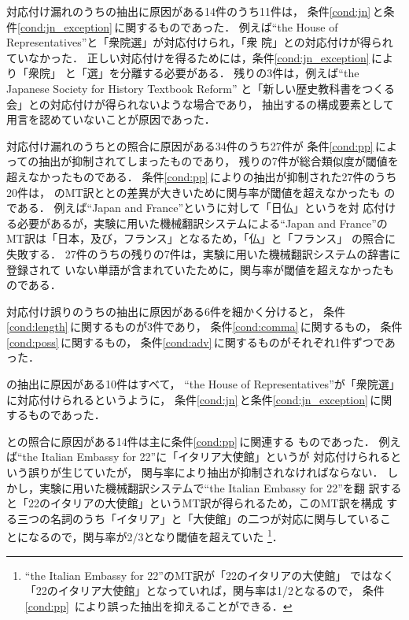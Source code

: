 対応付け漏れのうち{\JNP}の抽出に原因がある14件のうち11件は，
条件\ref{cond:jn}\,と条件\ref{cond:jn_exception}\,に関するものであった．
例えば``the House of Representatives''と「衆院選」が対応付けられ，「衆
院」との対応付けが得られていなかった．
正しい対応付けを得るためには，条件\ref{cond:jn_exception}\,により「衆院」
と「選」を分離する必要がある．
残りの3件は，例えば``the Japanese Society for History Textbook Reform''
と「新しい歴史教科書をつくる会」との対応付けが得られないような場合であり，
抽出する{\JNP}の構成要素として用言を認めていないことが原因であった．

対応付け漏れのうち{\MTNP}と{\JNP}の照合に原因がある34件のうち27件が
条件\ref{cond:pp}\,によって{\JNP}の抽出が抑制されてしまったものであり，
残りの7件が総合類似度が閾値を超えなかったものである．
条件\ref{cond:pp}\,により{\JNP}の抽出が抑制された27件のうち20件は，
{\CPNP}のMT訳と{\JNP}との差異が大きいために関与率が閾値を超えなかったも
のである．
例えば``Japan and France''という{\CPNP}に対して「日仏」という{\JNP}を対
応付ける必要があるが，実験に用いた機械翻訳システムによる``Japan and 
France''のMT訳は「日本，及び，フランス」となるため，「仏」と「フランス」
の照合に失敗する．
27件のうちの残りの7件は，実験に用いた機械翻訳システムの辞書に登録されて
いない単語が含まれていたために，関与率が閾値を超えなかったものである．

対応付け誤りのうち{\CPNP}の抽出に原因がある6件を細かく分けると，
条件\ref{cond:length}\,に関するものが3件であり，
条件\ref{cond:comma}\,に関するもの，
条件\ref{cond:poss}\,に関するもの，
条件\ref{cond:adv}\,に関するものがそれぞれ1件ずつであった．

{\JNP}の抽出に原因がある10件はすべて，
``the House of Representatives''が「衆院選」に対応付けられるというように，
条件\ref{cond:jn}\,と条件\ref{cond:jn_exception}\,に関するものであった．

{\MTNP}と{\JNP}の照合に原因がある14件は主に条件\ref{cond:pp}\,に関連する
ものであった．
例えば``the Italian Embassy for 22''に「イタリア大使館」という{\JNP}が
対応付けられるという誤りが生じていたが，
関与率により抽出が抑制されなければならない．
しかし，実験に用いた機械翻訳システムで``the Italian Embassy for 22''を翻
訳すると「22のイタリアの大使館」というMT訳が得られるため，このMT訳を構成
する三つの名詞のうち「イタリア」と「大使館」の二つが対応に関与しているこ
とになるので，関与率が2/3となり閾値を超えていた
\footnote{``the Italian Embassy for 22''のMT訳が「22のイタリアの大使館」
ではなく「22のイタリア大使館」となっていれば，関与率は1/2となるので，
条件\ref{cond:pp}\, により誤った抽出を抑えることができる．}．

